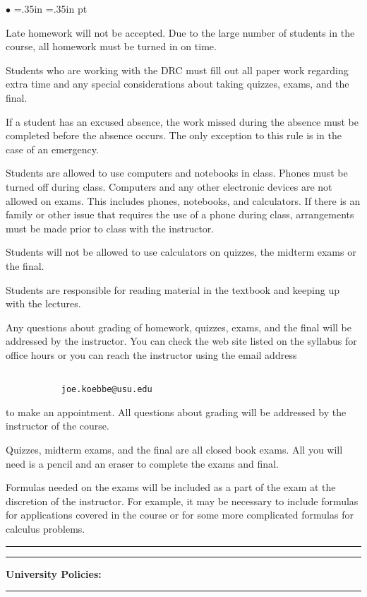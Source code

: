 \documentclass[10pt,fleqn]{article}
\begin{document}
\begin{list}{$\bullet$}{ \parsep=0pt \listparindent=0pt
\topsep=0pt \rightmargin=.35in \leftmargin=.35in   pt \itemsep=2pt}
  \item Late homework will not be accepted. Due to the large number of students
        in the course, all homework must be turned in on time.
  \item Students who are working with the DRC must fill out all paper work
        regarding extra time and any special considerations about taking
        quizzes, exams, and the final.
  \item If a student has an excused absence, the work missed during the absence
        must be completed before the absence occurs. The only exception to this
        rule is in the case of an emergency.
  \item Students are allowed to use computers and notebooks in class. Phones
        must be turned off during class. Computers and any other electronic
        devices are not allowed on exams. This includes phones, notebooks, and
        calculators. If there is an family or other issue that requires the use
        of a phone during class, arrangements must be made prior to class with
        the instructor.
  \item Students will not be allowed to use calculators on quizzes, the midterm
        exams or the final.
  \item Students are responsible for reading material in the textbook and
        keeping up with the lectures.

  \item Any questions about grading of homework, quizzes, exams, and the final 
        will be addressed by the instructor. You can check the web site listed
        on the syllabus for office hours or you can reach the instructor using
        the email address
        \begin{verbatim}

           joe.koebbe@usu.edu

        \end{verbatim}
        to make an appointment. All questions about grading will be addressed by
        the instructor of the course.
  \item Quizzes, midterm exams, and the final are all closed book exams. All you
        will need is a pencil and an eraser to complete the exams and final.
  \item Formulas needed on the exams will be included as a part of the exam at
        the discretion of the instructor. For example, it may be necessary to
        include formulas for applications covered in the course or for some more
        complicated formulas for calculus problems.
\end{list}
\vskip0.1in\hrule\vskip0.1in
\newpage
\vskip0.1in\hrule\vskip0.1in
\noindent
{\bf University Policies:}
\vskip0.1in\hrule\vskip0.1in
\end{document}
